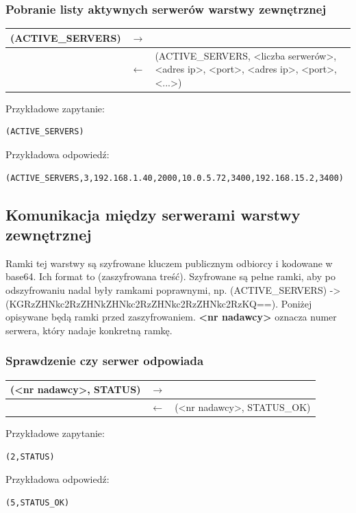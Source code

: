 \subsubsection{Pobranie listy aktywnych serwerów warstwy zewnętrznej}

\begin{longtable}{| p{} | p{}| p{} |} 
\hline
(ACTIVE\_SERVERS) & $\rightarrow$ &  \\ \hline
 & $\leftarrow$ & (ACTIVE\_SERVERS, <liczba serwerów>, <adres ip>, <port>, <adres ip>, <port>, <...>) \\ \hline
\end{longtable}

Przykładowe zapytanie:
\begin{lstlisting}[style=incode]
(ACTIVE_SERVERS)
\end{lstlisting}
Przykładowa odpowiedź:
\begin{lstlisting}[style=incode]
(ACTIVE_SERVERS,3,192.168.1.40,2000,10.0.5.72,3400,192.168.15.2,3400)
\end{lstlisting}

\subsection{Komunikacja między serwerami warstwy zewnętrznej}

Ramki tej warstwy są szyfrowane kluczem publicznym odbiorcy i kodowane w base64. Ich format to (zaszyfrowana treść). Szyfrowane są pełne ramki, aby po odszyfrowaniu nadal były ramkami poprawnymi, np. (ACTIVE\_SERVERS) -> (KGRzZHNkc2RzZHNkZHNkc2RzZHNkc2RzZHNkc2RzKQ==). Poniżej opisywane będą ramki przed zaszyfrowaniem.
\textbf{<nr nadawcy>} oznacza numer serwera, który nadaje konkretną ramkę.

\subsubsection{Sprawdzenie czy serwer odpowiada}

\begin{longtable}{| p{} | p{}| p{} |} 
\hline
(<nr nadawcy>, STATUS) & $\rightarrow$ &  \\ \hline
 & $\leftarrow$ & (<nr nadawcy>, STATUS\_OK) \\ \hline
\end{longtable}

Przykładowe zapytanie:
\begin{lstlisting}[style=incode]
(2,STATUS)
\end{lstlisting}
Przykładowa odpowiedź:
\begin{lstlisting}[style=incode]
(5,STATUS_OK)
\end{lstlisting}

